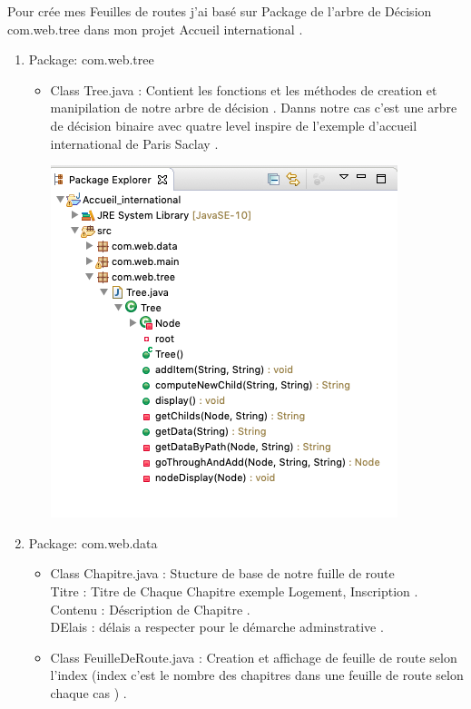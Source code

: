     Pour crée mes Feuilles de routes j’ai basé sur Package de l’arbre de
    Décision com.web.tree dans mon projet Accueil international .

\begin{enumerate}

\item Package: com.web.tree 
\begin{itemize}
\item Class Tree.java   : Contient les fonctions et les méthodes de creation et manipilation de notre arbre de décision .
Danns notre cas c'est une arbre de décision binaire avec quatre level inspire de l'exemple d'accueil international de Paris Saclay .


\includegraphics[scale=0.6]{Images/ad.png}

   
\end{itemize}


\item Package: com.web.data

\begin{itemize}
\item Class Chapitre.java : Stucture de base de notre fuille de route
\\Titre : Titre de Chaque Chapitre exemple Logement, Inscription .
\\ Contenu : Déscription de Chapitre .
\\DElais : délais a respecter pour le démarche adminstrative .

\item Class FeuilleDeRoute.java  :  Creation et affichage de feuille de route
selon l'index (index c'est le nombre des chapitres dans une feuille de route selon chaque cas ) .
\\


\end{itemize}
\end{enumerate}
